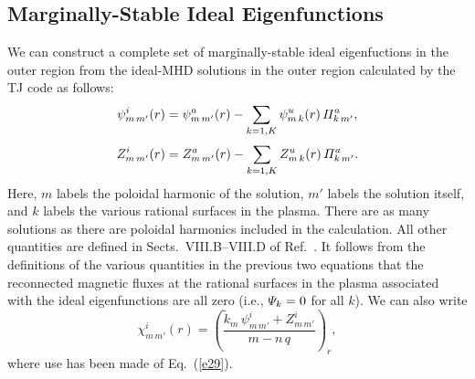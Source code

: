 \documentclass[12pt,prb,aps]{revtex4-1}
\begin{document}
\subsection{Marginally-Stable Ideal Eigenfunctions}\label{sideal}
We can construct a complete set of  marginally-stable ideal eigenfuctions in the outer region from the ideal-MHD solutions in the outer region calculated by the TJ code as follows:
\begin{align}
\psi_{m\,m'}^i(r)&= \psi_{m\,m'}^a(r)-\sum_{k=1,K}\psi_{m\,k}^u(r)\,{\mit\Pi}_{k\,m'}^a,\\[0.5ex]
Z_{m\,m'}^i(r)&= Z_{m\,m'}^a(r)-\sum_{k=1,K}Z_{m\,k}^u(r)\,{\mit\Pi}_{k\,m'}^a.
\end{align}
 Here, $m$ labels the poloidal harmonic of the solution,  $m'$ labels the solution itself, and $k$ labels the various rational surfaces in the plasma. There are as many solutions as there are poloidal harmonics included in the calculation. All other quantities are defined in Sects.~VIII.B--VIII.D of Ref.~. 
 It follows
from the definitions of the various quantities in the previous two equations  that the reconnected magnetic  fluxes at the rational surfaces in the plasma
associated with the ideal eigenfunctions are all zero (i.e., ${\mit\Psi}_k=0$ for all $k$). We can also write
\begin{equation}\label{e39}
\chi^i_{m\,m'}(r) = \left(\frac{\tilde{k}_{m}\,\psi^i_{m\,m'}+Z_{m\,m'}^i}{m-n\,q}\right)_r,
\end{equation}
where use has been made of Eq.~(\ref{e29}).
\end{document}
